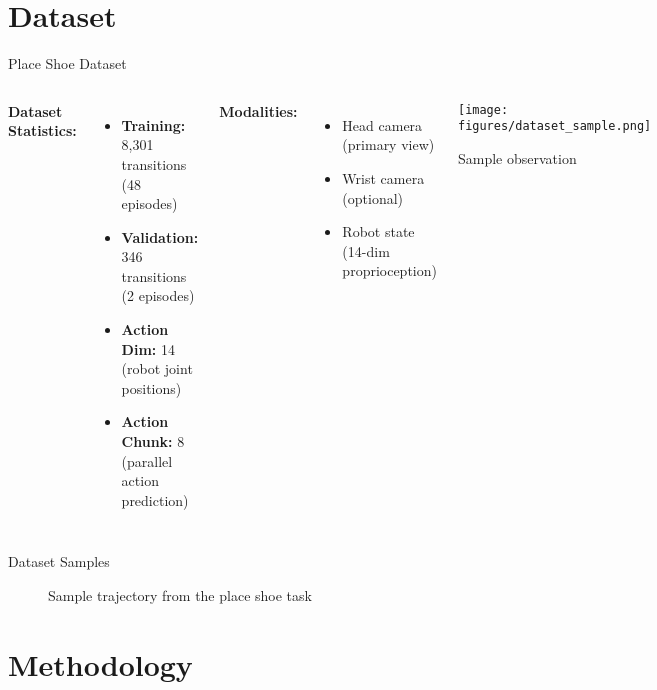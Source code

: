 \documentclass[aspectratio=169]{beamer}
\begin{document}
\section{Dataset}

\begin{frame}{Place Shoe Dataset}
\begin{columns}
\textbf{Dataset Statistics:}
\begin{itemize}
    \item \textbf{Training:} 8,301 transitions (48 episodes)
    \item \textbf{Validation:} 346 transitions (2 episodes)
    \item \textbf{Action Dim:} 14 (robot joint positions)
    \item \textbf{Action Chunk:} 8 (parallel action prediction)
\end{itemize}

\vspace{0.3cm}
\textbf{Modalities:}
\begin{itemize}
    \item Head camera (primary view)
    \item Wrist camera (optional)
    \item Robot state (14-dim proprioception)
\end{itemize}

\begin{center}
\texttt{[image: figures/dataset\_sample.png]}
\caption{Sample observation}
\end{center}
\end{columns}
\end{frame}

\begin{frame}{Dataset Samples}
\begin{figure}
\centering
{}
\caption{Sample trajectory from the place shoe task}
\end{figure}
\end{frame}

\section{Methodology}
\end{document}
